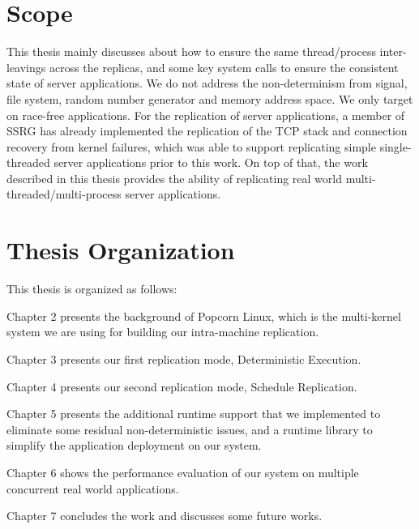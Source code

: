 \section{Scope}
This thesis mainly discusses about how to ensure the same thread/process inter-leavings across the replicas, and some key system calls to ensure the consistent state of server applications. We do not address the non-determinism from signal, file system, random number generator and memory address space. We only target on race-free applications. For the replication of server applications, a member of SSRG has already implemented the replication of the TCP stack and connection recovery from kernel failures, which was able to support replicating simple single-threaded server applications prior to this work. On top of that, the work described in this thesis provides the ability of replicating real world multi-threaded/multi-process server applications.

\section{Thesis Organization}
This thesis is organized as follows:

Chapter 2 presents the background of Popcorn Linux, which is the multi-kernel system we are using for building our intra-machine replication.

Chapter 3 presents our first replication mode, Deterministic Execution. 

Chapter 4 presents our second replication mode, Schedule Replication.

Chapter 5 presents the additional runtime support that we implemented to eliminate some residual non-deterministic issues, and a runtime library to simplify the application deployment on our system.

Chapter 6 shows the performance evaluation of our system on multiple concurrent real world applications.

Chapter 7 concludes the work and discusses some future works.